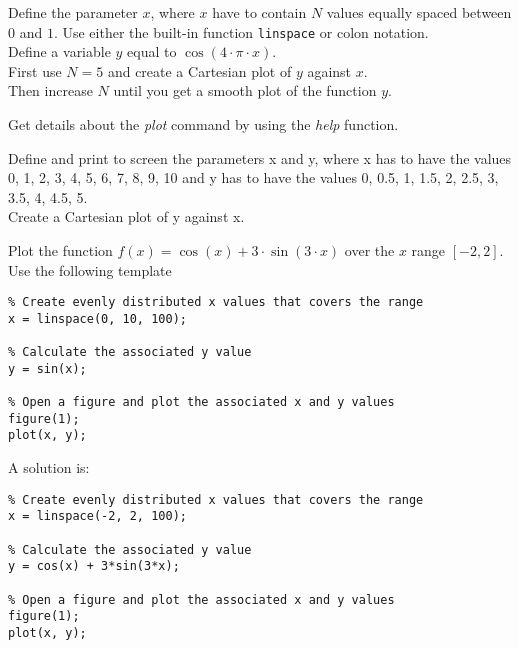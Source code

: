 \begin{ex}
Define the parameter $x$, where $x$ have to contain $N$ values equally spaced between $0$
and $1$. Use either the built-in function \texttt{linspace} or colon notation.\\
Define a variable $y$ equal to $\cos(4\cdot \pi \cdot x)$.\\
First use $N = 5$ and create a Cartesian plot of $y$ against $x$.\\
Then increase $N$ until you get a smooth plot of the function $y$.
\end{ex}

\begin{ex}
Get details about the \emph{plot} command by using the \emph{help} function.
\end{ex}



\begin{ex}
Define and print to screen the parameters x and y, where x has to have the values 0, 1,
2, 3, 4, 5, 6, 7, 8, 9, 10 and y has to have the values 0, 0.5, 1, 1.5, 2, 2.5, 3, 3.5, 4, 4.5,
5.\\
Create a Cartesian plot of y against x.
\end{ex}


\begin{ex}
Plot the function $f(x) = \cos(x) + 3 \cdot \sin(3 \cdot x)$
over the $x$ range $[-2, 2]$.
Use the following template 
\begin{lstlisting}
% Create evenly distributed x values that covers the range
x = linspace(0, 10, 100);

% Calculate the associated y value
y = sin(x);

% Open a figure and plot the associated x and y values
figure(1);
plot(x, y);
\end{lstlisting}
\begin{sol}
A solution is:
\begin{lstlisting}
% Create evenly distributed x values that covers the range
x = linspace(-2, 2, 100);

% Calculate the associated y value
y = cos(x) + 3*sin(3*x);

% Open a figure and plot the associated x and y values
figure(1);
plot(x, y);
\end{lstlisting}
\end{sol}
\end{ex}



